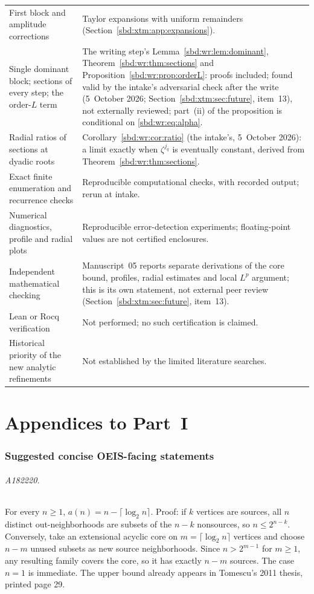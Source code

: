\documentclass[11pt,a4paper]{article}
\theoremstyle{definition}
\begin{document}
\begin{longtable}{p{}p{}}
First block and amplitude corrections & Taylor expansions with uniform
remainders (Section~\ref{sbd:xtm:app:expansions}).\\
Single dominant block; sections of every step; the order-$L$ term &
The writing step's Lemma~\ref{sbd:wr:lem:dominant},
Theorem~\ref{sbd:wr:thm:sections} and
Proposition~\ref{sbd:wr:prop:orderL}: proofs included; found valid by the
intake's adversarial check after the write (5~October 2026;
Section~\ref{sbd:xtm:sec:future}, item~13), not externally reviewed;
part~(ii) of the proposition is conditional on
\eqref{sbd:wr:eq:alpha}.\\
Radial ratios of sections at dyadic roots & Corollary~\ref{sbd:wr:cor:ratio}
(the intake's, 5~October 2026): a limit exactly when $\zeta^{j_q}$ is
eventually constant, derived from Theorem~\ref{sbd:wr:thm:sections}.\\
Exact finite enumeration and recurrence checks & Reproducible
computational checks, with recorded output; rerun at intake.\\
Numerical diagnostics, profile and radial plots & Reproducible
error-detection experiments; floating-point values are not certified
enclosures.\\
Independent mathematical checking & Manuscript~05 reports separate
derivations of the core bound, profiles, radial estimates and local $L^p$
argument; this is its own statement, not external peer review
(Section~\ref{sbd:xtm:sec:future}, item~13).\\
Lean or Rocq verification & Not performed; no such certification is
claimed.\\
Historical priority of the new analytic refinements & Not established by the
limited literature searches.\\
\bottomrule
\end{longtable}

\clearpage
{}
\part*{Appendices to Part~I}

\appendix
\section{Suggested concise OEIS-facing statements}\label{sbd:app:oeis}

\paragraph{A182220.}
For every $n\ge1$, $a(n)=n-\lceil\log_2n\rceil$.
Proof: if $k$ vertices are sources, all $n$ distinct out-neighborhoods
are subsets of the $n-k$ nonsources, so $n\le2^{n-k}$. Conversely,
take an extensional acyclic core on $m=\lceil\log_2n\rceil$ vertices
and choose $n-m$ unused subsets as new source neighborhoods. Since
$n>2^{m-1}$ for $m\ge1$, any resulting family covers the core, so it has
exactly $n-m$ sources. The case $n=1$ is immediate. The upper bound
already appears in Tomescu's 2011 thesis, printed page 29.
\end{document}
